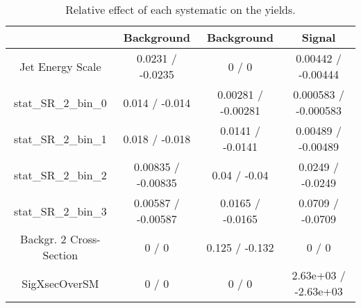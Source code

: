 \documentclass[10pt]{article}
\begin{document}
\begin{table}[htbp]
\begin{center}
\begin{tabular}{|c|c|c|c|}
\hline 
      & Background      & Background      & Signal \\ 
\hline 
  Jet Energy Scale & 0.0231 / -0.0235 & 0 / 0 & 0.00442 / -0.00444 \\ 
 stat_SR_2_bin_0 & 0.014 / -0.014 & 0.00281 / -0.00281 & 0.000583 / -0.000583 \\ 
 stat_SR_2_bin_1 & 0.018 / -0.018 & 0.0141 / -0.0141 & 0.00489 / -0.00489 \\ 
 stat_SR_2_bin_2 & 0.00835 / -0.00835 & 0.04 / -0.04 & 0.0249 / -0.0249 \\ 
 stat_SR_2_bin_3 & 0.00587 / -0.00587 & 0.0165 / -0.0165 & 0.0709 / -0.0709 \\ 
  Backgr. 2 Cross-Section & 0 / 0 & 0.125 / -0.132 & 0 / 0 \\ 
 SigXsecOverSM & 0 / 0 & 0 / 0 & 2.63e+03 / -2.63e+03 \\ 
\hline 
\end{tabular} 
\caption{Relative effect of each systematic on the yields.} 
\end{center} 
\end{table} 
\end{document}
